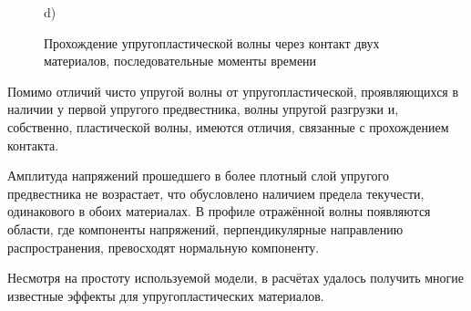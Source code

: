 \begin{figure}
\begin{minipage}{0.35\linewidth}
\end{minipage}
\hfill
\begin{minipage}{0.35\linewidth}
 d)\\
\end{minipage}
\caption{Прохождение упругопластической волны через контакт двух материалов, последовательные моменты времени}
\label{pic:pl-contact}
\end{figure}

Помимо отличий чисто упругой волны от упругопластической, проявляющихся в наличии у первой упругого предвестника, волны упругой разгрузки и, собственно, пластической волны, имеются отличия, связанные с прохождением контакта. 

Амплитуда напряжений прошедшего в более плотный слой упругого предвестника не возрастает, что обусловлено наличием предела текучести, одинакового в обоих материалах. В профиле отражённой волны появляются области, где компоненты напряжений, перпендикулярные направлению распространения, превосходят нормальную компоненту.

Несмотря на простоту используемой модели, в расчётах удалось получить многие известные эффекты для упругопластических материалов.